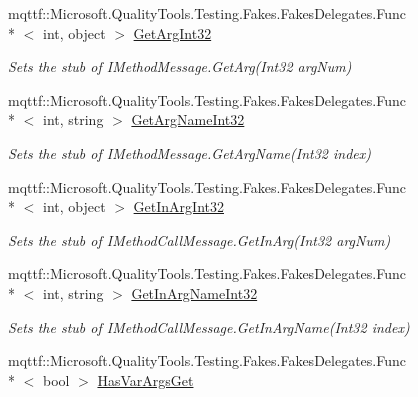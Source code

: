 \begin{DoxyCompactItemize}
mqttf\-::\-Microsoft.\-Quality\-Tools.\-Testing.\-Fakes.\-Fakes\-Delegates.\-Func\\*
$<$ int, object $>$ \hyperlink{class_system_1_1_runtime_1_1_remoting_1_1_activation_1_1_fakes_1_1_stub_i_construction_call_message_a7e93ceef65654f43a2cce4263d429168}{Get\-Arg\-Int32}
\begin{DoxyCompactList}\small\item\em Sets the stub of I\-Method\-Message.\-Get\-Arg(\-Int32 arg\-Num)\end{DoxyCompactList}\item 
mqttf\-::\-Microsoft.\-Quality\-Tools.\-Testing.\-Fakes.\-Fakes\-Delegates.\-Func\\*
$<$ int, string $>$ \hyperlink{class_system_1_1_runtime_1_1_remoting_1_1_activation_1_1_fakes_1_1_stub_i_construction_call_message_a16e741f2a31b393d19b989c218099c3a}{Get\-Arg\-Name\-Int32}
\begin{DoxyCompactList}\small\item\em Sets the stub of I\-Method\-Message.\-Get\-Arg\-Name(\-Int32 index)\end{DoxyCompactList}\item 
mqttf\-::\-Microsoft.\-Quality\-Tools.\-Testing.\-Fakes.\-Fakes\-Delegates.\-Func\\*
$<$ int, object $>$ \hyperlink{class_system_1_1_runtime_1_1_remoting_1_1_activation_1_1_fakes_1_1_stub_i_construction_call_message_ae0123da4478a7d2ff4e379e5ef5bf1cc}{Get\-In\-Arg\-Int32}
\begin{DoxyCompactList}\small\item\em Sets the stub of I\-Method\-Call\-Message.\-Get\-In\-Arg(\-Int32 arg\-Num)\end{DoxyCompactList}\item 
mqttf\-::\-Microsoft.\-Quality\-Tools.\-Testing.\-Fakes.\-Fakes\-Delegates.\-Func\\*
$<$ int, string $>$ \hyperlink{class_system_1_1_runtime_1_1_remoting_1_1_activation_1_1_fakes_1_1_stub_i_construction_call_message_a66b784ffb00bea69ed2e7f7135ee47ac}{Get\-In\-Arg\-Name\-Int32}
\begin{DoxyCompactList}\small\item\em Sets the stub of I\-Method\-Call\-Message.\-Get\-In\-Arg\-Name(\-Int32 index)\end{DoxyCompactList}\item 
mqttf\-::\-Microsoft.\-Quality\-Tools.\-Testing.\-Fakes.\-Fakes\-Delegates.\-Func\\*
$<$ bool $>$ \hyperlink{class_system_1_1_runtime_1_1_remoting_1_1_activation_1_1_fakes_1_1_stub_i_construction_call_message_a18bc6fbaa98a9b3071dd6723b9b11d10}{Has\-Var\-Args\-Get}

\end{DoxyCompactItemize}
